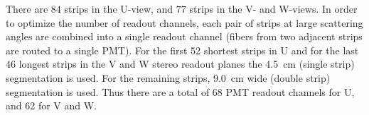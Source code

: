 There are $84$ strips in the U-view, and $77$ strips in the V- and W-views. In order to optimize the number of readout channels, each pair of strips at large scattering angles are combined into a single readout channel (fibers from two adjacent strips are routed to a single PMT).  For the first 52 shortest strips in U and for the last 46 longest strips in the V and W stereo readout planes the 4.5~cm (single strip) segmentation is used. For the remaining strips, 9.0~cm wide (double strip) segmentation is used.  Thus there are a total of 68 PMT readout channels for U, and 62 for V and W.




